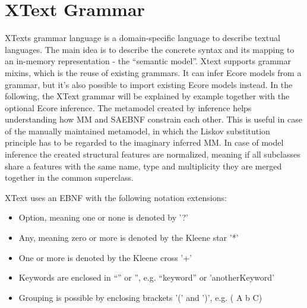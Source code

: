 \section{XText Grammar}
XTexts grammar language is a domain-specific language to describe textual languages. The main idea is to describe the concrete syntax and its mapping to an in-memory representation - the ``semantic model''. Xtext supports grammar mixins, which is the reuse of existing grammars. It can infer Ecore models from a grammar, but it's also possible to import existing Ecore models instead. In the following, the XText grammar will be explained by example together with the optional Ecore  inference. The metamodel created by inference helps understanding how MM and SAEBNF constrain each other. This is useful in case of the manually maintained metamodel, in which the Liskov substitution principle has to be regarded to the imaginary inferred MM. In case of model inference the created structural features are normalized, meaning if all subclasses share a features with the same name, type and multiplicity they are merged together in the common superclass.

XText uses an EBNF with the following notation extensions:
\begin{itemize}
	\item Option, meaning one or none is denoted by '?'
	\item Any, meaning zero or more is denoted by the Kleene star '*'
	\item One or more is denoted by the Kleene cross '+'
	\item Keywords are enclosed in ``'' or '', e.g. ``keyword'' or 'anotherKeyword'
	\item Grouping is possible by enclosing brackets '(' and  ')', e.g.  ( A b C)
\end{itemize}

